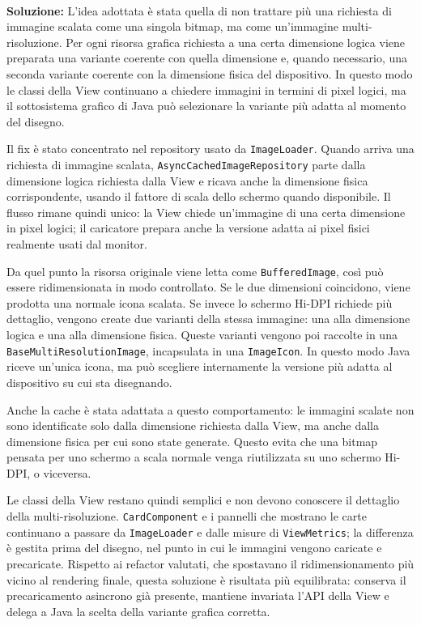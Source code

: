 \textbf{\\Soluzione:} L'idea adottata è stata quella di non trattare più una
richiesta di immagine scalata come una singola bitmap, ma come un'immagine
multi-risoluzione. Per ogni risorsa grafica richiesta a una certa dimensione
logica viene preparata una variante coerente con quella dimensione e, quando
necessario, una seconda variante coerente con la dimensione fisica del
dispositivo. In questo modo le classi della View continuano a chiedere immagini
in termini di pixel logici, ma il sottosistema grafico di Java può selezionare
la variante più adatta al momento del disegno.

Il fix è stato concentrato nel repository usato da \texttt{ImageLoader}. Quando
arriva una richiesta di immagine scalata, \texttt{AsyncCachedImageRepository}
parte dalla dimensione logica richiesta dalla View e ricava anche la dimensione
fisica corrispondente, usando il fattore di scala dello schermo quando
disponibile. Il flusso rimane quindi unico: la View chiede un'immagine di una
certa dimensione in pixel logici; il caricatore prepara anche la versione adatta
ai pixel fisici realmente usati dal monitor.

Da quel punto la risorsa originale viene letta come \texttt{BufferedImage}, così
può essere ridimensionata in modo controllato. Se le due dimensioni coincidono,
viene prodotta una normale icona scalata. Se invece lo schermo Hi-DPI richiede
più dettaglio, vengono create due varianti della stessa immagine: una alla
dimensione logica e una alla dimensione fisica. Queste varianti vengono poi
raccolte in una \texttt{BaseMultiResolutionImage}, incapsulata in una
\texttt{ImageIcon}. In questo modo Java riceve un'unica icona, ma può scegliere
internamente la versione più adatta al dispositivo su cui sta disegnando.

Anche la cache è stata adattata a questo comportamento: le immagini scalate non
sono identificate solo dalla dimensione richiesta dalla View, ma anche dalla
dimensione fisica per cui sono state generate. Questo evita che una bitmap
pensata per uno schermo a scala normale venga riutilizzata su uno schermo
Hi-DPI, o viceversa.

Le classi della View restano quindi semplici e non devono conoscere il dettaglio
della multi-risoluzione. \texttt{CardComponent} e i pannelli che mostrano le
carte continuano a passare da \texttt{ImageLoader} e dalle misure di
\texttt{ViewMetrics}; la differenza è gestita prima del disegno, nel punto in
cui le immagini vengono caricate e precaricate. Rispetto ai refactor valutati,
che spostavano il ridimensionamento più vicino al rendering finale, questa
soluzione è risultata più equilibrata: conserva il precaricamento asincrono già
presente, mantiene invariata l'API della View e delega a Java la scelta della
variante grafica corretta.

